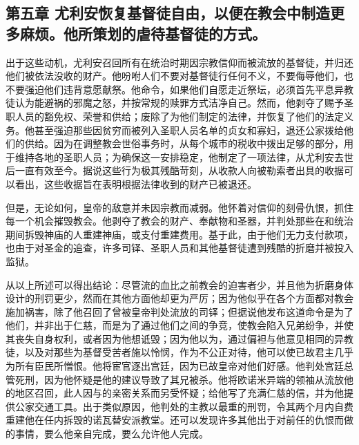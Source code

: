 
\subsection{第五章  尤利安恢复基督徒自由，以便在教会中制造更多麻烦。他所策划的虐待基督徒的方式。}

出于这些动机，尤利安召回所有在统治时期因宗教信仰而被流放的基督徒，并归还他们被依法没收的财产。他吩咐人们不要对基督徒行任何不义，不要侮辱他们，也不要强迫他们违背意愿献祭。他命令，如果他们自愿走近祭坛，必须首先平息异教徒认为能避祸的邪魔之怒，并按常规的赎罪方式洁净自己。然而，他剥夺了赐予圣职人员的豁免权、荣誉和供给；废除了为他们制定的法律，并恢复了他们的法定义务。他甚至强迫那些因贫穷而被列入圣职人员名单的贞女和寡妇，退还公家拨给他们的供给。因为在调整教会世俗事务时，从每个城市的税收中拨出足够的部分，用于维持各地的圣职人员；为确保这一安排稳定，他制定了一项法律，从尤利安去世后一直有效至今。据说这些行为极其残酷苛刻，从收款人向被勒索者出具的收据可以看出，这些收据旨在表明根据法律收到的财产已被退还。\par

但是，无论如何，皇帝的敌意并未因宗教而减弱。他怀着对信仰的刻骨仇恨，抓住每一个机会摧毁教会。他剥夺了教会的财产、奉献物和圣器，并判处那些在和统治期间拆毁神庙的人重建神庙，或支付重建费用。基于此，由于他们无力支付款项，也由于对圣金的追查，许多司铎、圣职人员和其他基督徒遭到残酷的折磨并被投入监狱。\par

从以上所述可以得出结论：尽管流的血比之前教会的迫害者少，并且他为折磨身体设计的刑罚更少，然而在其他方面他却更为严厉；因为他似乎在各个方面都对教会施加祸害，除了他召回了曾被皇帝判处流放的司铎；但据说他发布这道命令是为了他们，并非出于仁慈，而是为了通过他们之间的争竞，使教会陷入兄弟纷争，并使其丧失自身权利，或者因为他想诋毁；因为他以为，通过偏袒与他意见相同的异教徒，以及对那些为基督受苦者施以怜悯，作为不公正对待，他可以使已故君主几乎为所有臣民所憎恨。他将宦官逐出宫廷，因为已故皇帝对他们好感。他判处宫廷总管死刑，因为他怀疑是他的建议导致了其兄被杀。他将欧诺米异端的领袖从流放他的地区召回，此人因与的亲密关系而另受怀疑；给他写了充满仁慈的信，并为他提供公家交通工具。出于类似原因，他判处的主教以最重的刑罚，令其两个月内自费重建他在任内拆毁的诺瓦替安派教堂。还可以发现许多其他出于对前任的仇恨而做的事情，要么他亲自完成，要么允许他人完成。\par

